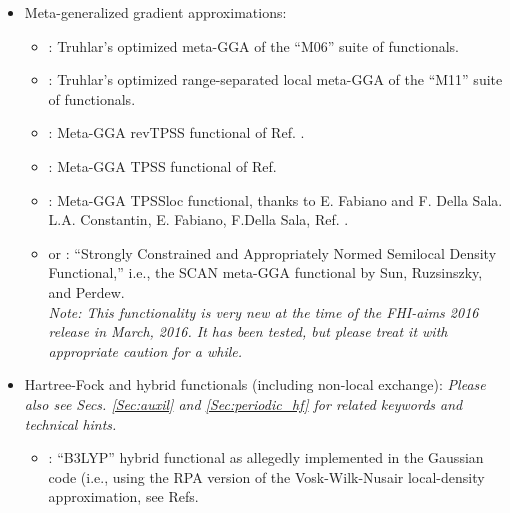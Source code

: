 \begin{itemize}
\begin{itemize}
        usually referred to as  
        ``Perdew-Wang 1991 GGA''. This GGA is most accessibly
        described in References 26 and 27 of Ref. \cite{Perdew92}. Note
        that the often mis-quoted reference \cite{Per92} does
        \emph{not}(!) describe the Perdew-Wang GGA but instead only the
        correlation part of the local-density approximation described above.
    \end{itemize}
  \item Meta-generalized gradient approximations:
    \begin{itemize}
      \item {} : Truhlar's optimized meta-GGA of the ``M06'' suite of
        functionals. \cite{ZhaoTruhlar06_M06-L}
      \item {} : Truhlar's optimized range-separated local meta-GGA of the ``M11'' suite of
         functionals. \cite{PeveratiTruhlar11_M11-L}
      \item {} : Meta-GGA revTPSS functional of Ref. \cite{Perdew09_revTPSS, Perdew11_revTPSS}.
      \item {} : Meta-GGA TPSS functional of Ref. \cite{Tao03_TPSS}
      \item {} : Meta-GGA TPSSloc functional, thanks to E. Fabiano
         and F. Della Sala. L.A. Constantin, E. Fabiano, F.Della Sala,
         Ref. \cite{Constantin2012}.
      \item {} or : ``Strongly Constrained and
         Appropriately Normed Semilocal Density Functional,'' i.e., the
         SCAN meta-GGA functional by Sun, Ruzsinszky, and
         Perdew.\cite{Sun2015} \\
         \emph{Note: This functionality is very new at the time of the
         FHI-aims 2016 release in March, 2016. It has been tested, but
         please treat it with appropriate caution for a while.}
    \end{itemize}
  \item Hartree-Fock and hybrid functionals (including non-local exchange): 
     \emph{Please also see Secs. \ref{Sec:auxil} and \ref{Sec:periodic_hf} for related keywords and technical hints.}
    \begin{itemize}
      \item {} : ``B3LYP'' hybrid functional as allegedly
        implemented in the Gaussian code (i.e., using the RPA version of the
        Vosk-Wilk-Nusair local-density approximation, see Refs. \cite{Vosko80,Scuseria05}

\end{itemize}
\end{itemize}
